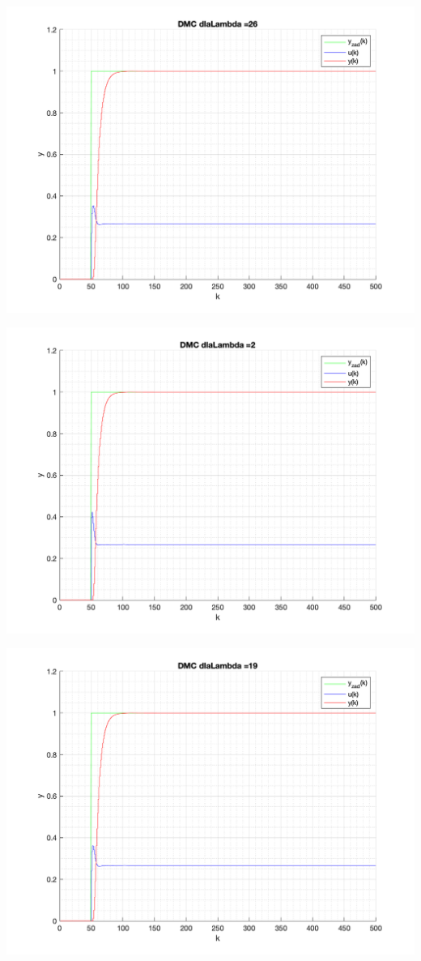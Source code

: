 \documentclass[a4paper, 11pt]{article}
\begin{document}
\begin{enumerate}
 \includegraphics[width=\linewidth]{./ModelsP4_Lambda/P4_DMC_Lambda_26_png.png} 
 
 \includegraphics[width=\linewidth]{./ModelsP4_Lambda/P4_DMC_Lambda_2_png.png} 
 
 \includegraphics[width=\linewidth]{./ModelsP4_Lambda/P4_DMC_Lambda_19_png.png} 
 

\end{enumerate}
\end{document}
